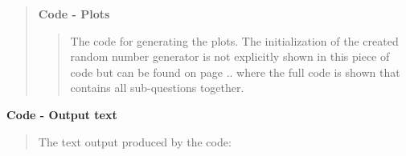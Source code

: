 \begin{quote}
\textbf{Code - Plots}



\begin{quote}
The code for generating the plots. The initialization of the created random number generator is not explicitly shown in this piece of code but can be found on page .. where the full code is shown that contains all sub-questions together.


\end{quote}
\end{quote}

\textbf{Code - Output text } 
\begin{quote}
The text output produced by the code:

\end{quote}
\newpage

